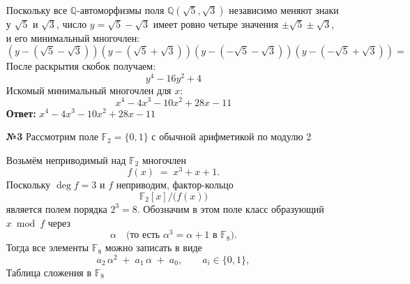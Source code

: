\documentclass[a4paper]{article}
\begin{document}
\begin{enumerate}
  Поскольку все $\mathbb{Q}$-автоморфизмы поля $\mathbb{Q}(\sqrt5,\sqrt3)$ 
  независимо меняют знаки у $\sqrt5$ и $\sqrt3$, число $y=\sqrt5-\sqrt3$ 
  имеет ровно четыре значения $\pm\sqrt5\pm\sqrt3$, и его минимальный многочлен:
  $$(y-(\sqrt{5} - \sqrt{3}))(y-(\sqrt{5} + \sqrt{3}))(y-(-\sqrt{5} - \sqrt{3}))
  (y-(-\sqrt{5} + \sqrt{3})) = $$
  После раскрытия скобок получаем:
  $$y^4 - 16y^2 + 4$$
  Искомый минимальный многочлен для $x$:
  $$x^4 - 4x^3 - 10x^2 + 28x - 11$$
  \textbf{Ответ: } $x^4 - 4x^3 - 10x^2 + 28x - 11$\\


  \item[\textbf{№3}]Рассмотрим поле $\mathbb{F}_2 = \{0,1\}$ с обычной арифметикой по модулю 2

  Возьмём неприводимый над $\mathbb{F}_2$ многочлен
  $$
  f(x) \;=\; x^3 + x + 1.
  $$
  Поскольку $\deg f = 3$ и $f$ неприводим, фактор‐кольцо
  $$
  \mathbb{F}_2[x] / \bigl(f(x)\bigr)
  $$
  является полем порядка $2^3 = 8$. Обозначим в этом поле класс образующий $x \bmod f$ через
  $$
  \alpha \quad\text{(то есть \(\alpha^3 = \alpha + 1\) в \(\mathbb{F}_8\)).}
  $$
  Тогда все элементы $\mathbb{F}_8$ можно записать в виде
  $$
  a_2\,\alpha^2 \;+\; a_1\,\alpha \;+\; a_0,
  \qquad 
  a_i \in \{0,1\},
  $$
  Таблица сложения в $\mathbb{F}_8$
  
  \\


\end{enumerate}
\end{document}
